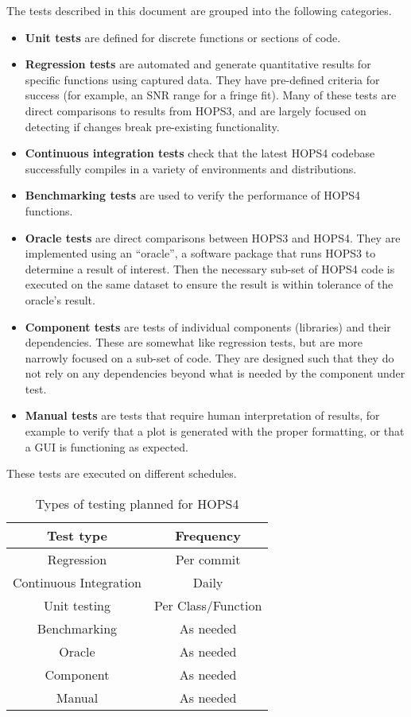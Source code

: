 \documentclass[notitlepage,letterpaper,pdftex,12pt,final]{article}
\numberwithin{equation}{section}
\begin{document}
The tests described in this document are grouped into the following categories.

\begin{itemize}
\item[] \textbf{Unit tests} are defined for discrete functions or sections of code.
\item[] \textbf{Regression tests} are automated and generate quantitative results for specific
  functions using captured data. They have pre-defined criteria for success (for example, an SNR range for a fringe fit). Many of these tests are direct comparisons to results from HOPS3,
  and are largely focused on detecting if changes break pre-existing functionality.
\item[] \textbf{Continuous integration tests} check that the latest HOPS4 codebase successfully compiles in a variety of environments and distributions.
\item[] \textbf{Benchmarking tests} are used to verify the performance of HOPS4 functions.
\item[] \textbf{Oracle tests} are direct comparisons between HOPS3 and HOPS4. They are implemented using an ``oracle'', a software package that runs HOPS3 to determine a result of interest. Then the necessary sub-set of HOPS4 code is executed on the same dataset to ensure the result is within tolerance of the oracle's result.
\item[] \textbf{Component tests} are tests of individual components (libraries) and their dependencies. These are somewhat like regression tests, but are more narrowly focused on a sub-set of code. They are designed such that they do not rely on any dependencies beyond what is needed by the component under test. 
\item[] \textbf{Manual tests} are tests that require human interpretation of results, for example to verify that a plot is generated with the proper formatting, or that a GUI is functioning as expected.

\end{itemize}

These tests are executed on different schedules.

\begin{table}[h!]
\centering
 \begin{tabular}{c | c} 
 Test type & Frequency \\ [0.5ex] 
 \hline%
 Regression &  Per commit \\ 
 Continuous Integration & Daily \\
 Unit testing & Per Class/Function \\ 
 Benchmarking & As needed \\
 Oracle  & As needed \\
 Component & As needed \\ 
 Manual & As needed \\ [1ex]
 \end{tabular}
 \caption{Types of testing planned for HOPS4}
 \label{table:2}
\end{table}
\end{document}
